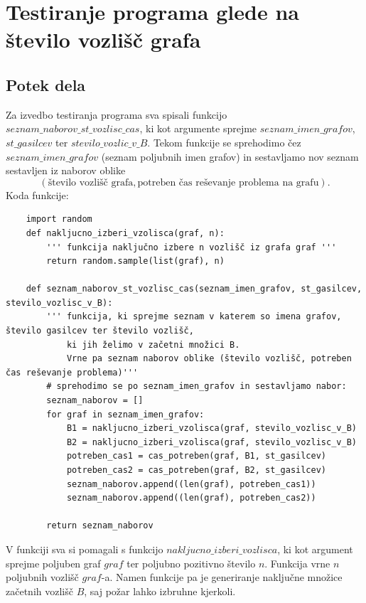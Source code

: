 \documentclass[a4paper, 12pt]{article}
\begin{document}
\pagebreak

\overfullrule=0pt
\section{Testiranje programa glede na število vozlišč grafa}

\subsection{Potek dela}

Za izvedbo testiranja programa sva spisali funkcijo $seznam\_naborov\_st\_vozlisc\_cas$, ki
kot argumente sprejme $seznam\_imen\_grafov$, $st\_gasilcev$ ter $stevilo\_vozlic\_v\_B$. Tekom
funkcije se sprehodimo čez $seznam\_imen\_grafov$ (seznam poljubnih imen grafov) in sestavljamo 
nov seznam sestavljen iz naborov oblike  
$$\left( \text{število vozlišč grafa}, \text{potreben čas reševanje problema na grafu} \right).$$
Koda funkcije:

\begin{scriptsize}
\begin{verbatim}
    import random
    def nakljucno_izberi_vzolisca(graf, n):
        ''' funkcija naključno izbere n vozlišč iz grafa graf '''
        return random.sample(list(graf), n)

    def seznam_naborov_st_vozlisc_cas(seznam_imen_grafov, st_gasilcev, stevilo_vozlisc_v_B):
        ''' funkcija, ki sprejme seznam v katerem so imena grafov, število gasilcev ter število vozlišč, 
            ki jih želimo v začetni množici B.
            Vrne pa seznam naborov oblike (število vozlišč, potreben čas reševanje problema)'''
        # sprehodimo se po seznam_imen_grafov in sestavljamo nabor:
        seznam_naborov = []
        for graf in seznam_imen_grafov:
            B1 = nakljucno_izberi_vzolisca(graf, stevilo_vozlisc_v_B)
            B2 = nakljucno_izberi_vzolisca(graf, stevilo_vozlisc_v_B)
            potreben_cas1 = cas_potreben(graf, B1, st_gasilcev)
            potreben_cas2 = cas_potreben(graf, B2, st_gasilcev)
            seznam_naborov.append((len(graf), potreben_cas1))
            seznam_naborov.append((len(graf), potreben_cas2))
        
        return seznam_naborov\end{verbatim}
\end{scriptsize}

\noindent V funkciji sva si pomagali s funkcijo $nakljucno\_izberi\_vozlisca$, ki kot 
argument sprejme poljuben graf $graf$ ter poljubno pozitivno število $n$. Funkcija vrne 
$n$ poljubnih vozlišč $graf$-a. Namen funkcije pa je generiranje naključne množice začetnih 
vozlišč $B$, saj požar lahko izbruhne kjerkoli. \\
\end{document}
